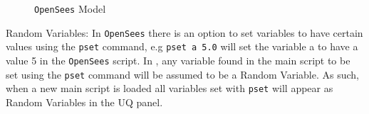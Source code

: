 \begin{figure}[!htbp]
  \caption{\texttt{OpenSees} Model}
  \label{fig:figure3}
\end{figure}

Random Variables: In \texttt{OpenSees} there is an option to set
variables to have certain values using the \texttt{pset} command, e.g
\texttt{pset a 5.0} will set the variable a to have a value 5 in the
\texttt{OpenSees} script. In \texttt{\getsoftwarename{}}, any variable
found in the main script to be set using the \texttt{pset} command
will be assumed to be a Random Variable. As such, when a new main
script is loaded all variables set with \texttt{pset} will appear as
Random Variables in the UQ panel.
